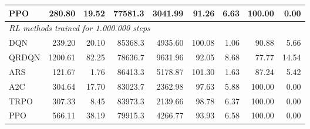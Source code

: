 \begin{samepage}
\begin{center}
\begin{tabular}{l|rr|rr|rr|rr}
    PPO          &   280.80 &    19.52 &    77581.3 &    3041.99 &   91.26 &    6.63 &  100.00 &    0.00 \\
    \midrule
    \multicolumn{9}{l}{\textit{RL methods trained for 1.000.000 steps}} \\
    \midrule
    DQN          &   239.20 &    20.10 &    85368.3 &    4935.60 &  100.08 &    1.06 &   90.88 &    5.66 \\
    QRDQN        &  1200.61 &    82.25 &    78636.7 &    9631.96 &   92.05 &    8.68 &   77.77 &   14.54 \\
    ARS          &   121.67 &     1.76 &    86413.3 &    5178.87 &  101.30 &    1.63 &   87.24 &    5.42 \\
    A2C          &   304.64 &    17.70 &    83023.7 &    2362.98 &   97.63 &    5.88 &  100.00 &    0.00 \\
    TRPO         &   307.33 &     8.45 &    83973.3 &    2139.66 &   98.78 &    6.37 &  100.00 &    0.00 \\
    PPO          &   566.11 &    38.19 &    79915.3 &    4266.77 &   93.93 &    6.58 &  100.00 &    0.00 \\
    \bottomrule
  \end{tabular}
\end{center}
\end{samepage}

